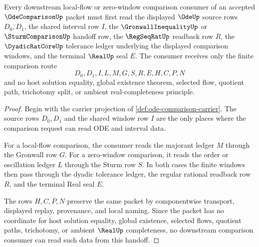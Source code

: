 \begin{theorem}
\label{thm:ode-comparison-gronwall-sturm-handoff}
Every downstream local-flow or zero-window comparison consumer of an accepted $\OdeComparisonUp$ packet must first read the displayed $\OdeUp$ source rows $D_0,D_1$, the shared interval row $I$, the $\GronwallInequalityUp$ or $\SturmComparisonUp$ handoff row, the $\RegSeqRatUp$ readback row $R$, the $\DyadicRatCoreUp$ tolerance ledger underlying the displayed comparison windows, and the terminal $\RealUp$ seal $E$. The consumer receives only the finite comparison route
$$
D_0,D_1,I,L,M,G,S,R,E,H,C,P,N
$$
and no host solution equality, global existence theorem, selected flow, quotient path, trichotomy split, or ambient real-completeness principle.
\end{theorem}
\begin{proof}
Begin with the carrier projection of \autoref{def:ode-comparison-carrier}. The source rows $D_0,D_1$ and the shared window row $I$ are the only places where the comparison request can read ODE and interval data.

For a local-flow comparison, the consumer reads the majorant ledger $M$ through the Gronwall row $G$. For a zero-window comparison, it reads the order or oscillation ledger $L$ through the Sturm row $S$. In both cases the finite windows then pass through the dyadic tolerance ledger, the regular rational readback row $R$, and the terminal Real seal $E$.

The rows $H,C,P,N$ preserve the same packet by componentwise transport, displayed replay, provenance, and local naming. Since the packet has no coordinate for host solution equality, global existence, selected flows, quotient paths, trichotomy, or ambient $\RealUp$ completeness, no downstream comparison consumer can read such data from this handoff.
\end{proof}

\begin{closurestatus}{\OdeComparisonUp}
  \theoryclosure{\seedClosure}
  \formalstatus{\unformalizedV}
\end{closurestatus}
